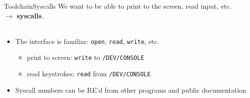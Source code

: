 \documentclass[12pt,aspectratio=169]{beamer}
\begin{document}
\begin{frame}{Toolchain}{Syscalls}
We want to be able to print to the screen, read input, etc.~\
$\longrightarrow$ \textbf{syscalls}.
~\\~\\
\begin{itemize}
	\item The interface is familiar: \texttt{open}, \texttt{read}, \texttt{write}, etc.
	\begin{itemize}
		\item print to screen: \texttt{write} to \texttt{/DEV/CONSOLE}
		\item read keystrokes: \texttt{read} from \texttt{/DEV/CONSOLE}
	\end{itemize}
	\item Syscall numbers can be RE'd from other programs and public documentation
\end{itemize}
\end{frame}
\end{document}
